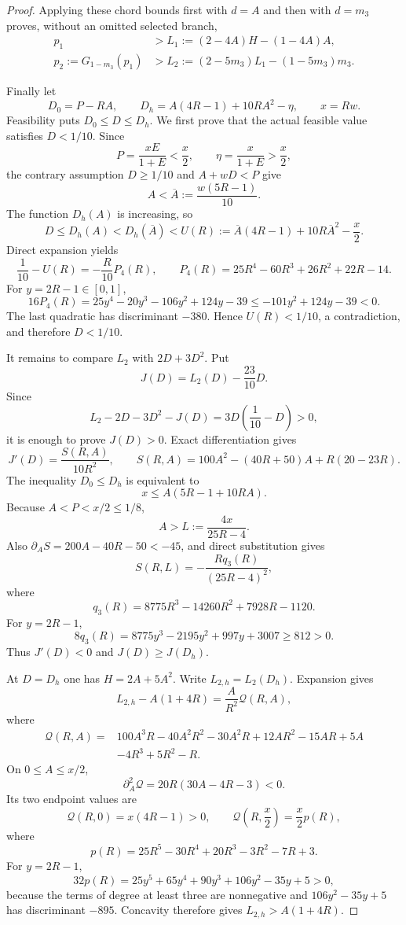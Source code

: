 \begin{proof}
Applying these chord bounds first with $d=A$ and then with $d=m_3$ proves,
without an omitted selected branch,
\begin{align*}
 p_1&>L_1:=(2-4A)H-(1-4A)A,\\
 p_2:=G_{1-m_3}(p_1)&>L_2:=(2-5m_3)L_1-(1-5m_3)m_3.
\end{align*}

Finally let
\[
 D_0=P-RA,\qquad
 D_h=A(4R-1)+10RA^2-\eta,\qquad x=Rw.
\]
Feasibility puts $D_0\le D\le D_h$.  We first prove that the actual
feasible value satisfies $D<1/10$.  Since
\[
 P=\frac{xE}{1+E}<\frac x2,\qquad
 \eta=\frac{x}{1+E}>\frac x2,
\]
the contrary assumption $D\ge1/10$ and $A+wD<P$ give
\[
 A<\overline A:=\frac{w(5R-1)}{10}.
\]
The function $D_h(A)$ is increasing, so
\[
 D\le D_h(A)<D_h(\overline A)
 <U(R):=\overline A(4R-1)+10R\overline A^2-\frac x2.
\]
Direct expansion yields
\[
 \frac1{10}-U(R)=-\frac{R}{10}P_4(R),
 \qquad
 P_4(R)=25R^4-60R^3+26R^2+22R-14.
\]
For $y=2R-1\in[0,1]$,
\[
 16P_4(R)=25y^4-20y^3-106y^2+124y-39
 \le-101y^2+124y-39<0.
\]
The last quadratic has discriminant $-380$.  Hence $U(R)<1/10$, a
contradiction, and therefore $D<1/10$.

It remains to compare $L_2$ with $2D+3D^2$.  Put
\[
 J(D)=L_2(D)-\frac{23}{10}D.
\]
Since
\[
 L_2-2D-3D^2-J(D)=3D\left(\frac1{10}-D\right)>0,
\]
it is enough to prove $J(D)>0$.  Exact differentiation gives
\[
 J'(D)=\frac{S(R,A)}{10R^2},\qquad
 S(R,A)=100A^2-(40R+50)A+R(20-23R).
\]
The inequality $D_0\le D_h$ is equivalent to
\[
 x\le A(5R-1+10RA).
\]
Because $A<P<x/2\le1/8$,
\[
 A>L:=\frac{4x}{25R-4}.
\]
Also $\partial_A S=200A-40R-50<-45$, and direct substitution gives
\[
 S(R,L)=-\frac{R q_3(R)}{(25R-4)^2},
\]
where
\[
 q_3(R)=8775R^3-14260R^2+7928R-1120.
\]
For $y=2R-1$,
\[
 8q_3(R)=8775y^3-2195y^2+997y+3007\ge812>0.
\]
Thus $J'(D)<0$ and $J(D)\ge J(D_h)$.

At $D=D_h$ one has $H=2A+5A^2$.  Write $L_{2,h}=L_2(D_h)$.
Expansion gives
\[
 L_{2,h}-A(1+4R)=\frac{A}{R^2}\mathcal Q(R,A),
\]
where
\[
\begin{aligned}
 \mathcal Q(R,A)={}&100A^3R-40A^2R^2-30A^2R
 +12AR^2-15AR+5A\\
 &-4R^3+5R^2-R.
\end{aligned}
\]
On $0\le A\le x/2$,
\[
 \partial_A^2\mathcal Q=20R(30A-4R-3)<0.
\]
Its two endpoint values are
\[
 \mathcal Q(R,0)=x(4R-1)>0,\qquad
 \mathcal Q\left(R,\frac x2\right)=\frac{x}{2}p(R),
\]
where
\[
 p(R)=25R^5-30R^4+20R^3-3R^2-7R+3.
\]
For $y=2R-1$,
\[
 32p(R)=25y^5+65y^4+90y^3+106y^2-35y+5>0,
\]
because the terms of degree at least three are nonnegative and
$106y^2-35y+5$ has discriminant $-895$.  Concavity therefore gives
$L_{2,h}>A(1+4R)$.


\end{proof}

